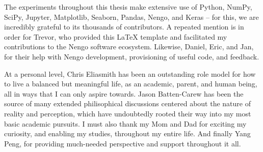 \newpage

The experiments throughout this thesis make extensive use of Python, NumPy, SciPy, Jupyter, Matplotlib, Seaborn, Pandas, Nengo, and Keras -- for this, we are incredibly grateful to its thousands of contributors.
A repeated mention is in order for Trevor, who provided this \LaTeX{} template and facilitated my contributions to the Nengo software ecosystem.
Likewise, Daniel, Eric, and Jan, for their help with Nengo development, provisioning of useful code, and feedback.

At a personal level, Chris Eliasmith has been an outstanding role model for how to live a balanced but meaningful life, as an academic, parent, and human being, all in ways that I can only aspire towards.
Jason Batten-Carew has been the source of many extended philisophical discussions centered about the nature of reality and perception, which have undoubtedly rooted their way into my most basic academic pursuits.
I must also thank my Mom and Dad for exciting my curiosity, and enabling my studies, throughout my entire life.
And finally Yang Peng, for providing much-needed perspective and support throughout it all.

\cleardoublepage
